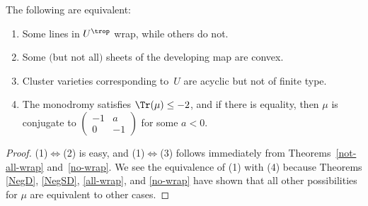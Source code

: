 \begin{prop}\label{SomeWrap} The following are equivalent:
\begin{enumerate}\itemsep=0pt
\item[$1.$] Some {lines} in $U^{\trop}$ wrap, while others do not.
\item[$2.$] Some $($but not all$)$ sheets of the {developing map} are convex.
\item[$3.$] Cluster varieties corresponding to~$U$ are {acyclic} but not of {finite type}.
\item[$4.$] The {monodromy} satisfies $\Tr(\mu) \leq -2$, and if there is equality, then $\mu$ is conjugate to $
	\left(\begin{smallmatrix}
		-1 &a \\
		0 &-1
		\end{smallmatrix}\right)$ for some $a<0$.
\end{enumerate}
\end{prop}
\begin{proof}(1)$\Leftrightarrow$(2) is easy, and (1)$\Leftrightarrow$(3) follows immediately from Theorems~\ref{not-all-wrap} and~\ref{no-wrap}. We see the equivalence of (1) with (4) because Theorems \ref{NegD}, \ref{NegSD}, \ref{all-wrap}, and \ref{no-wrap} have shown that all other possibilities for $\mu$ are equivalent to other cases.
\end{proof}

